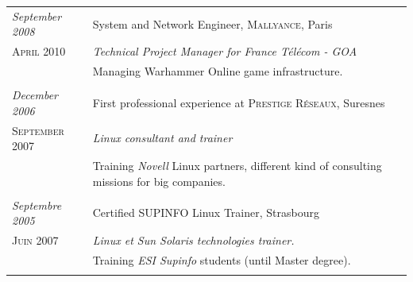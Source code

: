 \documentclass[a4paper,10pt]{article}
\begin{document}
\begin{tabular}{p{}|p{}}
 \emph{September 2008} & System and Network Engineer, \textsc{Mallyance}, Paris \\\textsc{April 2010}&\emph{Technical Project Manager for France Télécom - GOA}\\&\footnotesize{Managing Warhammer Online game infrastructure.}\\\multicolumn{2}{c}{} \\
 \emph{December 2006} & First professional experience at \textsc{Prestige Réseaux}, Suresnes \\\textsc{September 2007}&\emph{Linux consultant and trainer}\\&\footnotesize{Training \emph{Novell} Linux partners, different kind of consulting missions for big companies.}\\\multicolumn{2}{c}{} \\
 \emph{Septembre 2005} & Certified \textsc{SUPINFO} Linux Trainer, Strasbourg \\\textsc{Juin 2007}&\emph{Linux et Sun Solaris technologies trainer.}\\&\footnotesize{Training \emph{ESI Supinfo} students (until Master degree).}\\\multicolumn{2}{c}{}
\end{tabular}


\end{document}
